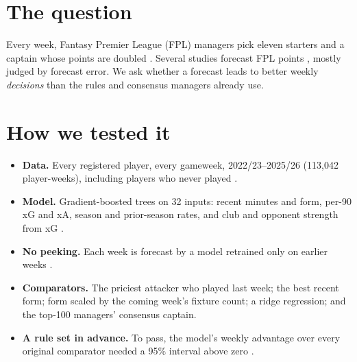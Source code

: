 \documentclass[10pt,a4paper,twocolumn]{article}
\begin{document}

\section{The question}
Every week, Fantasy Premier League (FPL) managers pick eleven starters and a captain whose points are
doubled \citep{fplrules}. Several studies forecast FPL points \citep{gupta2019,lombu2024,frees2024,ramezani2025},
mostly judged by forecast error. We ask whether a forecast leads to better weekly
\emph{decisions} than the rules and consensus managers already use.

\section{How we tested it}
\begin{itemize}
  \item \textbf{Data.} Every registered player, every gameweek, 2022/23--2025/26 (113,042
        player-weeks), including players who never played \citep{fplapi}.
  \item \textbf{Model.} Gradient-boosted trees \citep{friedman2001} on 32 inputs:
        recent minutes and form, per-90 xG and xA, season and prior-season rates, and club and
        opponent strength from xG \citep{maher1982,dixoncoles1997}.
  \item \textbf{No peeking.} Each week is forecast by a model retrained only on earlier weeks
        \citep{tashman2000}.
  \item \textbf{Comparators.} The priciest attacker who played last week; the best recent form;
        form scaled by the coming week's fixture count; a ridge regression; and the top-100
        managers' consensus captain.
  \item \textbf{A rule set in advance.} To pass, the model's weekly advantage over every original
        comparator needed a 95\% interval above zero \citep{nosek2018,efron1993}.
\end{itemize}
\end{document}

